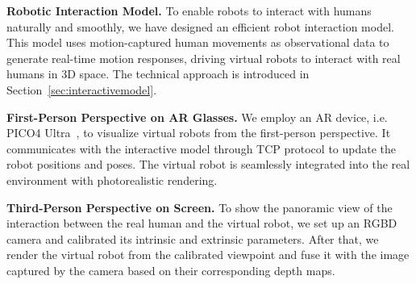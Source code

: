 

\noindent\textbf{Robotic Interaction Model.} To enable robots to interact with humans naturally and smoothly, we have designed an efficient robot interaction model. This model uses motion-captured human movements as observational data to generate real-time motion responses, driving virtual robots to interact with real humans in 3D space. The technical approach is introduced in Section~\ref{sec:interactivemodel}.

\noindent\textbf{First-Person Perspective on AR Glasses.} We employ an AR device, i.e. PICO4 Ultra~\cite{PicoInteractive2022}, to visualize virtual robots from the first-person perspective. It communicates with the interactive model through TCP protocol to update the robot positions and poses. The virtual robot is seamlessly integrated into the real environment %
with photorealistic rendering.

\noindent\textbf{Third-Person Perspective on Screen.} To show the panoramic view of the interaction between the real human and the virtual robot, we set up an RGBD camera and calibrated its intrinsic and extrinsic parameters. After that, we render the virtual robot from the calibrated viewpoint and fuse it with the image captured by the camera based on their corresponding depth maps.

